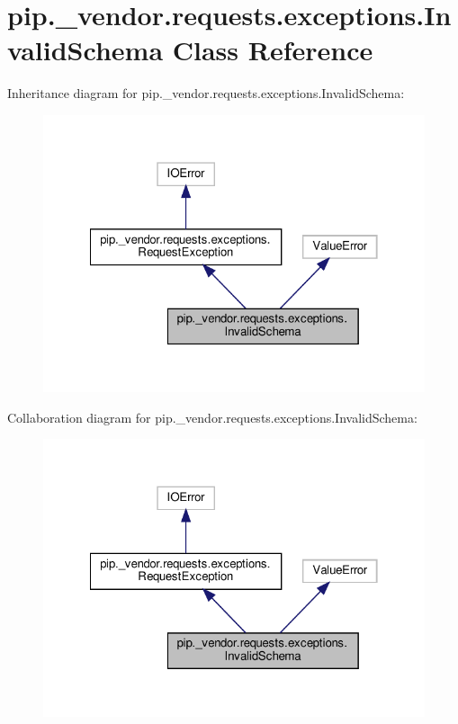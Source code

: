 \hypertarget{classpip_1_1__vendor_1_1requests_1_1exceptions_1_1InvalidSchema}{}\section{pip.\+\_\+vendor.\+requests.\+exceptions.\+Invalid\+Schema Class Reference}
\label{classpip_1_1__vendor_1_1requests_1_1exceptions_1_1InvalidSchema}


Inheritance diagram for pip.\+\_\+vendor.\+requests.\+exceptions.\+Invalid\+Schema\+:
\nopagebreak
\begin{figure}[H]
\begin{center}
\leavevmode
\includegraphics[width=322pt]{classpip_1_1__vendor_1_1requests_1_1exceptions_1_1InvalidSchema__inherit__graph}
\end{center}
\end{figure}


Collaboration diagram for pip.\+\_\+vendor.\+requests.\+exceptions.\+Invalid\+Schema\+:
\nopagebreak
\begin{figure}[H]
\begin{center}
\leavevmode
\includegraphics[width=322pt]{classpip_1_1__vendor_1_1requests_1_1exceptions_1_1InvalidSchema__coll__graph}
\end{center}
\end{figure}
